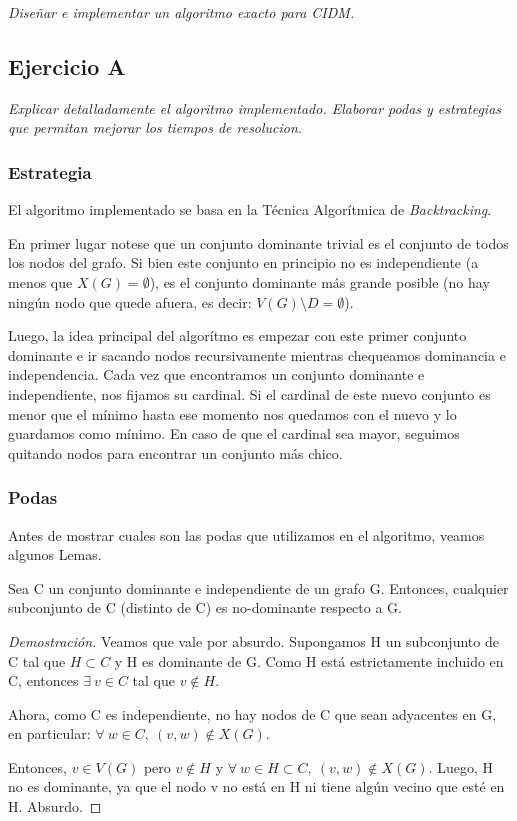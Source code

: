\textit{Diseñar e implementar un algoritmo exacto para CIDM.}

\subsection{Ejercicio A}

\textit{Explicar detalladamente el algoritmo implementado. Elaborar podas y estrategias que permitan mejorar los tiempos de resolucion.}

\medskip

\subsubsection{Estrategia}
El algoritmo implementado se basa en la Técnica Algorítmica de \textit{Backtracking}.

En primer lugar notese que un conjunto dominante trivial es el conjunto de todos los nodos del grafo. Si bien este conjunto en principio no es independiente (a menos que $X(G) = \emptyset$), es el conjunto dominante más grande posible (no hay ningún nodo que quede afuera, es decir: $V(G) \setminus D = \emptyset$).

Luego, la idea principal del algorítmo es empezar con este primer conjunto dominante e ir sacando nodos recursivamente mientras chequeamos dominancia e independencia. Cada vez que encontramos un conjunto dominante e independiente, nos fijamos su cardinal. Si el cardinal de este nuevo conjunto es menor que el mínimo hasta ese momento nos quedamos con el nuevo y lo guardamos como mínimo. En caso de que el cardinal sea mayor, seguimos quitando nodos para encontrar un conjunto más chico.

\subsubsection{Podas}

Antes de mostrar cuales son las podas que utilizamos en el algoritmo, veamos algunos Lemas.

    \begin{lemma}
        Sea C un conjunto dominante e independiente de un grafo G. Entonces, cualquier subconjunto de C (distinto de C) es no-dominante respecto a G.
    \end{lemma}
    \begin{proof}[Demostración]
        Veamos que vale por absurdo. Supongamos H un subconjunto de C tal que $H \subset C$ y H es dominante de G. Como H está estrictamente incluido en C, entonces $\exists\ v \in C$ tal que $v \notin H$.

        Ahora, como C es independiente, no hay nodos de C que sean adyacentes en G, en particular: $\forall\ w \in C,\ (v,w) \notin X(G)$.

        Entonces, $v \in V(G)$ pero $v \notin H$ y $\forall\ w \in H \subset C,\ (v,w) \notin X(G)$. Luego, H no es dominante, ya que el nodo v no está en H ni tiene algún vecino que esté en H. Absurdo.
    \end{proof}


